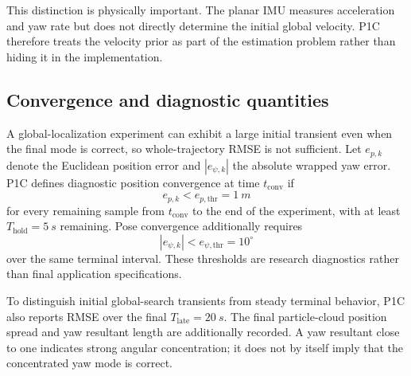 This distinction is physically important. The planar IMU measures acceleration and yaw rate but does not directly determine the initial global velocity. P1C therefore treats the velocity prior as part of the estimation problem rather than hiding it in the implementation.

\subsection{Convergence and diagnostic quantities}
A global-localization experiment can exhibit a large initial transient even when the final mode is correct, so whole-trajectory RMSE is not sufficient. Let $e_{p,k}$ denote the Euclidean position error and $|e_{\psi,k}|$ the absolute wrapped yaw error. P1C defines diagnostic position convergence at time $t_{\mathrm{conv}}$ if
\begin{equation}
e_{p,k}<e_{p,\mathrm{thr}}=\SI{1}{m}
\end{equation}
for every remaining sample from $t_{\mathrm{conv}}$ to the end of the experiment, with at least $T_{\mathrm{hold}}=\SI{5}{s}$ remaining. Pose convergence additionally requires
\begin{equation}
|e_{\psi,k}|<e_{\psi,\mathrm{thr}}=10^{\circ}
\end{equation}
over the same terminal interval. These thresholds are research diagnostics rather than final application specifications.

To distinguish initial global-search transients from steady terminal behavior, P1C also reports RMSE over the final $T_{\mathrm{late}}=\SI{20}{s}$. The final particle-cloud position spread and yaw resultant length are additionally recorded. A yaw resultant close to one indicates strong angular concentration; it does not by itself imply that the concentrated yaw mode is correct.

